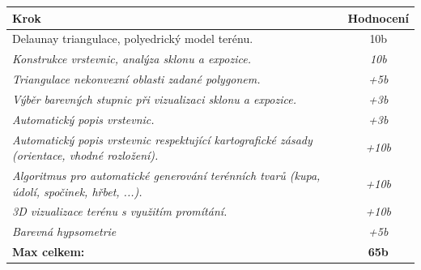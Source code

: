 \noindent
\begin{tabularx}{\textwidth}{|X|c|}
    \hline
    \textbf{Krok} & \textbf{Hodnocení} \\
    \hline\hline
    {Delaunay triangulace, polyedrický model terénu.} \cellcolor[HTML]{94F29E} & 10b \\
    \hline
    \textit{Konstrukce vrstevnic, analýza sklonu a expozice.} \cellcolor[HTML]{94F29E} & \textit{10b} \\
    \hline
    \textit{Triangulace nekonvexní oblasti zadané polygonem. } \cellcolor[HTML]{FFFFFF} & \textit{+5b} \\
    \hline
    \textit{Výběr barevných stupnic při vizualizaci sklonu a expozice.} \cellcolor[HTML]{FFFFFF} & \textit{+3b} \\
    \hline
    \textit{Automatický popis vrstevnic.} \cellcolor[HTML]{FFFFFF} & \textit{+3b} \\
    \hline
    \textit{Automatický popis vrstevnic respektující kartografické zásady (orientace, vhodné rozložení). } \cellcolor[HTML]{FFFFFF} & \textit{+10b} \\
    \hline
    \hline
    \textit{Algoritmus pro automatické generování terénních tvarů (kupa, údolí, spočinek, hřbet, ...).} \cellcolor[HTML]{FFFFFF} & \textit{+10b} \\
    \hline
    \hline
    \textit{3D vizualizace terénu s využitím promítání.} \cellcolor[HTML]{FFFFFF} & \textit{+10b} \\
    \hline
    \hline
    \textit{Barevná hypsometrie} \cellcolor[HTML]{FFFFFF} & \textit{+5b} \\
    \hline
    \textbf{Max celkem:} & \textbf{65b} \\
    \hline
\end{tabularx}

